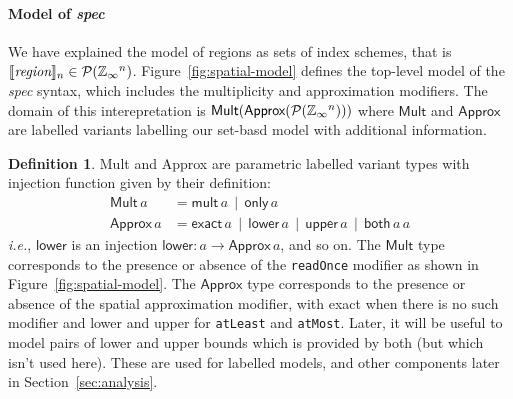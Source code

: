 \documentclass[9pt]{sigplanconf}
\newcounter{block}
\theoremstyle{definition}
\newtheorem{definition}[block]{Definition}
\newcommand{\ie}{\emph{i.e.}}
\newcommand{\interp}[1]{\llbracket{#1}\rrbracket}
\newcommand{\term}[1]{\texttt{#1}}
\begin{document}


\paragraph{Model of \textit{spec}}

We have explained the model of regions as sets of index
schemes, that is
$\interp{\textit{region}}_n \in \mathcal{P}(\domainVal{}^n)$.
Figure~\ref{fig:spatial-model} defines the top-level model of the
\textit{spec} syntax, which includes the multiplicity and
approximation modifiers. The domain of this interepretation
is $\textsf{Mult}(\textsf{Approx}(\mathcal{P}(\mathbb{Z}_\infty{}^n)))$
where $\textsf{Mult}$ and $\textsf{Approx}$ are labelled variants
labelling our set-basd model with additional information.

\begin{definition} \textsf{Mult}
and \textsf{Approx} are parametric labelled variant types
with injection function given by their definition:
%
\begin{align*}
\textsf{Mult} \, a & = \textsf{mult} \, a \,\mid\, \textsf{only} \, a \\
\textsf{Approx} \, a & = \textsf{exact} \, a \,\mid\, \textsf{lower} \, a \,\mid\,
\textsf{upper} \, a \,\mid\, \textsf{both} \, a \, a
\end{align*}
\ie{}, $\mathsf{lower}$ is an injection $\mathsf{lower} : a \rightarrow \mathsf{Approx} \, a$, and so
on. The $\textsf{Mult}$ type corresponds to the presence or absence of the
\term{readOnce} modifier as shown in Figure~\ref{fig:spatial-model}. 
The $\textsf{Approx}$ type corresponds to the presence or absence of
the spatial approximation modifier, with \textsf{exact} when there is
no such modifier and \textsf{lower} and \textsf{upper} for
\term{atLeast} and \term{atMost}. Later, it will be useful to model
pairs of lower and upper bounds which is provided by \textsf{both} 
(but which isn't used here). These are used for labelled models, and other components later in
Section~\ref{sec:analysis}.%
\label{def:mult-and-approx}
\end{definition}
\vspace{-0.5em}
\end{document}
